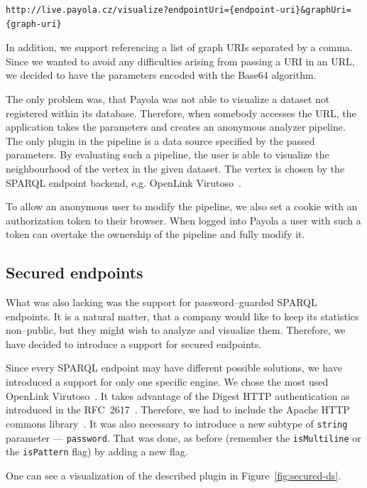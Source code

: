 {  \scriptsize
\begin{verbatim}
http://live.payola.cz/visualize?endpointUri={endpoint-uri}&graphUri={graph-uri}
\end{verbatim}
}

In addition, we support referencing a list of graph URIs separated by a comma. Since 
we wanted to avoid any difficulties arising from passing a URI in an 
URL, we decided to have the parameters encoded with the Base64 algorithm.

The only problem was, that Payola was not able to visualize a dataset not registered
within its database. Therefore, when somebody accesses the 
URL, the application takes the parameters and creates an anonymous analyzer 
pipeline. The only plugin in the pipeline is a data source specified by the 
passed parameters. By evaluating such a pipeline, the user is able to visualize 
the neighbourhood of the vertex in the given dataset. The vertex is chosen by the 
SPARQL endpoint backend, e.g. OpenLink Virutoso~\cite{virtuoso}.

To allow an anonymous user to modify the pipeline, we also set a 
cookie with an authorization token to their browser. When logged into  
Payola a user with such a token can overtake the ownership of the pipeline and 
fully modify it.

\subsection{Secured endpoints}
What was also lacking was the support for password--guarded SPARQL endpoints. 
It is a natural matter, that a company would like to keep its statistics 
non--public, but they might wish to analyze and visualize them. Therefore, we 
have decided to introduce a support for secured endpoints.

Since every SPARQL endpoint may have different possible solutions, we have 
introduced a support for only one specific engine. We chose the most
used OpenLink Virutoso~\cite{virtuoso}.
It takes advantage of the Digest HTTP authentication as introduced in the 
RFC~2617~\cite{rfc-2617}. Therefore, we had to include the Apache HTTP commons 
library~\cite{apache-http-commons}. It was also necessary to introduce a new 
subtype of \texttt{string} parameter --- \texttt{password}. That was done, as 
before (remember the \texttt{isMultiline} or the \texttt{isPattern} flag) by 
adding a new flag.

One can see a visualization of the described plugin in Figure~\ref{fig:secured-ds}. 

